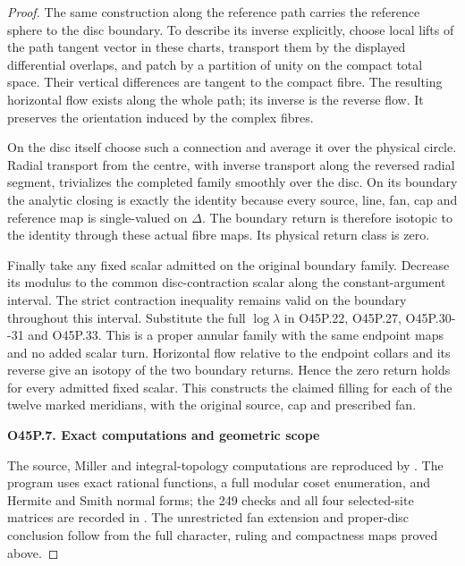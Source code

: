 \begin{proof}
The same construction along the reference path
carries the reference sphere to the disc boundary.
To describe its inverse explicitly, choose local
lifts of the path tangent vector in these charts,
transport them by the displayed differential
overlaps, and patch by a partition of unity on
the compact total space. Their vertical differences
are tangent to the compact fibre. The resulting
horizontal flow exists along the whole path; its
inverse is the reverse flow. It preserves the
orientation induced by the complex fibres.

On the disc itself choose such a connection and
average it over the physical circle. Radial
transport from the centre, with inverse transport
along the reversed radial segment, trivializes
the completed family smoothly over the disc.
On its boundary the analytic closing is exactly
the identity because every source, line, fan,
cap and reference map is single-valued on
\(\Delta\). The boundary return is therefore
isotopic to the identity through these actual
fibre maps. Its physical return class is zero.

Finally take any fixed scalar admitted on the
original boundary family. Decrease its modulus
to the common disc-contraction scalar along the
constant-argument interval. The strict
contraction inequality remains valid on the
boundary throughout this interval. Substitute
the full \(\log\lambda\) in O45P.22,
O45P.27, O45P.30-\/-31 and O45P.33.
This is a proper annular family with the
same endpoint maps and no added scalar turn.
Horizontal flow relative to the endpoint
collars and its reverse give an isotopy of
the two boundary returns. Hence the zero
return holds for every admitted fixed scalar.
This constructs the claimed filling for
each of the twelve marked meridians, with
the original source, cap and prescribed fan.

\par

\medskip\noindent\textbf{O45P.7. Exact computations and geometric scope}

\par\nobreak

The source, Miller and integral-topology computations are
reproduced by
.
The program uses exact rational functions, a full modular
coset enumeration, and Hermite and Smith normal forms;
the 249 checks and all four selected-site matrices are
recorded in
.
The unrestricted fan extension and proper-disc conclusion
follow from the full character, ruling and compactness
maps proved above.


\end{proof}
